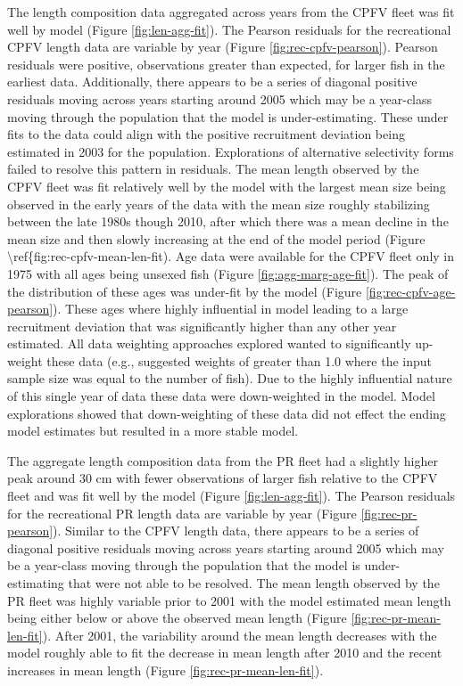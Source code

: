 \documentclass[11pt,
  english,
  letterpaper,
]{article}
\begin{document}
The length composition data aggregated across years from the CPFV fleet was fit well by model (Figure \ref{fig:len-agg-fit}). The Pearson residuals for the recreational CPFV length data are variable by year (Figure \ref{fig:rec-cpfv-pearson}). Pearson residuals were positive, observations greater than expected, for larger fish in the earliest data. Additionally, there appears to be a series of diagonal positive residuals moving across years starting around 2005 which may be a year-class moving through the population that the model is under-estimating. These under fits to the data could align with the positive recruitment deviation being estimated in 2003 for the population. Explorations of alternative selectivity forms failed to resolve this pattern in residuals. The mean length observed by the CPFV fleet was fit relatively well by the model with the largest mean size being observed in the early years of the data with the mean size roughly stabilizing between the late 1980s though 2010, after which there was a mean decline in the mean size and then slowly increasing at the end of the model period (Figure \textbackslash ref\{fig:rec-cpfv-mean-len-fit). Age data were available for the CPFV fleet only in 1975 with all ages being unsexed fish (Figure \ref{fig:agg-marg-age-fit}). The peak of the distribution of these ages was under-fit by the model (Figure \ref{fig:rec-cpfv-age-pearson}). These ages where highly influential in model leading to a large recruitment deviation that was significantly higher than any other year estimated. All data weighting approaches explored wanted to significantly up-weight these data (e.g., suggested weights of greater than 1.0 where the input sample size was equal to the number of fish). Due to the highly influential nature of this single year of data these data were down-weighted in the model. Model explorations showed that down-weighting of these data did not effect the ending model estimates but resulted in a more stable model.

The aggregate length composition data from the PR fleet had a slightly higher peak around 30 cm with fewer observations of larger fish relative to the CPFV fleet and was fit well by the model (Figure \ref{fig:len-agg-fit}). The Pearson residuals for the recreational PR length data are variable by year (Figure \ref{fig:rec-pr-pearson}). Similar to the CPFV length data, there appears to be a series of diagonal positive residuals moving across years starting around 2005 which may be a year-class moving through the population that the model is under-estimating that were not able to be resolved. The mean length observed by the PR fleet was highly variable prior to 2001 with the model estimated mean length being either below or above the observed mean length (Figure \ref{fig:rec-pr-mean-len-fit}). After 2001, the variability around the mean length decreases with the model roughly able to fit the decrease in mean length after 2010 and the recent increases in mean length (Figure \ref{fig:rec-pr-mean-len-fit}).
\end{document}
